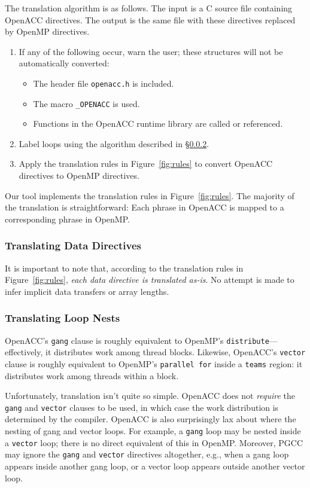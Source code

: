 \documentclass{sig-alternate-05-2015}
\begin{document}
The translation algorithm is as follows.  The input is a C source file
containing OpenACC directives.  The output is the same file with these
directives replaced by OpenMP directives.
\begin{enumerate}
\item If any of the following occur, warn the user; these structures will
not be automatically converted:
\begin{itemize}
\item The header file \texttt{openacc.h} is included.
\item The macro \texttt{\_OPENACC} is used.
\item Functions in the OpenACC runtime library are called or referenced.
\end{itemize}
\item Label loops using the algorithm described in \S\ref{sec:loops}.
\item Apply the translation rules in Figure~\ref{fig:rules} to convert
OpenACC directives to OpenMP directives.
\end{enumerate}

Our tool implements the translation rules in Figure~\ref{fig:rules}.  The
majority of the translation is straightforward: Each phrase in OpenACC is
mapped to a corresponding phrase in OpenMP\@.  

\subsubsection{Translating Data Directives}

It is important to note that, according to the translation rules in
Figure~\ref{fig:rules}, \emph{each data directive is translated as-is}.  No
attempt is made to infer implicit data transfers or array lengths.

\subsubsection{Translating Loop Nests}
\label{sec:loops}

OpenACC's \texttt{gang} clause is roughly equivalent to OpenMP's
\texttt{distribute}---effectively, it distributes work among thread blocks.
Likewise, OpenACC's \texttt{vector} clause is roughly equivalent to OpenMP's
\texttt{parallel for} inside a \texttt{teams} region: it distributes work among
threads within a block.

Unfortunately, translation isn't quite so simple.  OpenACC does not
\emph{require} the \texttt{gang} and \texttt{vector} clauses to be used, in
which case the work distribution is determined by the compiler.  OpenACC is
also surprisingly lax about where the nesting of gang and vector loops.  For
example, a \texttt{gang} loop may be nested inside a \texttt{vector} loop;
there is no direct equivalent of this in OpenMP.  Moreover, PGCC may ignore the
\texttt{gang} and \texttt{vector} directives altogether, e.g., when a gang loop
appears inside another gang loop, or a vector loop appears outside another
vector loop.
\end{document}
